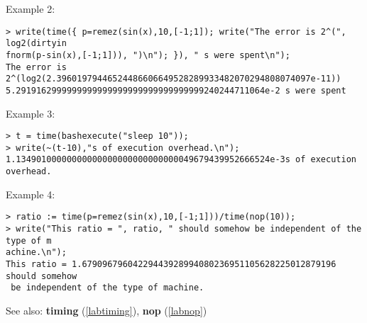 \noindent Example 2: 
\begin{center}\begin{minipage}{15cm}\begin{Verbatim}[frame=single]
> write(time({ p=remez(sin(x),10,[-1;1]); write("The error is 2^(", log2(dirtyin
fnorm(p-sin(x),[-1;1])), ")\n"); }), " s were spent\n");
The error is 2^(log2(2.39601979446524486606649528289933482070294808074097e-11))
5.2919162999999999999999999999999999999240244711064e-2 s were spent
\end{Verbatim}
\end{minipage}\end{center}
\noindent Example 3: 
\begin{center}\begin{minipage}{15cm}\begin{Verbatim}[frame=single]
> t = time(bashexecute("sleep 10"));
> write(~(t-10),"s of execution overhead.\n");
1.13490100000000000000000000000000049679439952666524e-3s of execution overhead.
\end{Verbatim}
\end{minipage}\end{center}
\noindent Example 4: 
\begin{center}\begin{minipage}{15cm}\begin{Verbatim}[frame=single]
> ratio := time(p=remez(sin(x),10,[-1;1]))/time(nop(10));
> write("This ratio = ", ratio, " should somehow be independent of the type of m
achine.\n");
This ratio = 1.67909679604229443928994080236951105628225012879196 should somehow
 be independent of the type of machine.
\end{Verbatim}
\end{minipage}\end{center}
See also: \textbf{timing} (\ref{labtiming}), \textbf{nop} (\ref{labnop})

